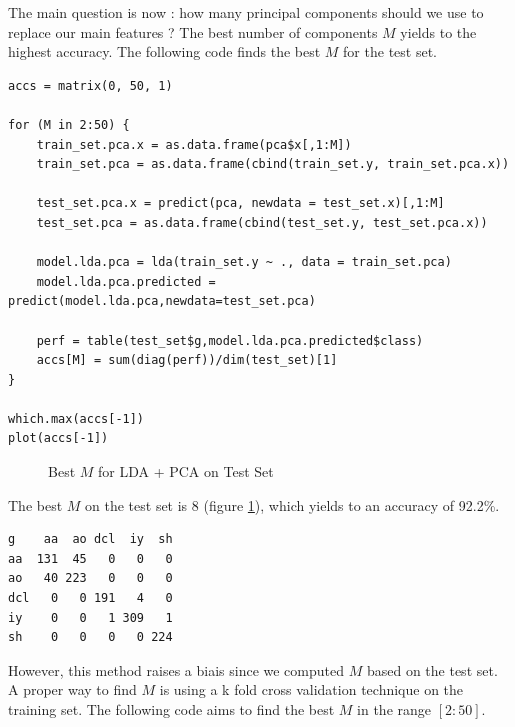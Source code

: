 \documentclass[]{report}
\newcommand{\inputtikz}[2]{%
	\scalebox{#1}{}  
}
\begin{document}
The main question is now : how many principal components should we use to replace our main features ? The best number of components $M$ yields to the highest accuracy. The following code finds the best $M$ for the test set.

\begin{lstlisting}
accs = matrix(0, 50, 1)

for (M in 2:50) {
	train_set.pca.x = as.data.frame(pca$x[,1:M])
	train_set.pca = as.data.frame(cbind(train_set.y, train_set.pca.x))
	
	test_set.pca.x = predict(pca, newdata = test_set.x)[,1:M]
	test_set.pca = as.data.frame(cbind(test_set.y, test_set.pca.x))
	
	model.lda.pca = lda(train_set.y ~ ., data = train_set.pca)
	model.lda.pca.predicted = predict(model.lda.pca,newdata=test_set.pca)
	
	perf = table(test_set$g,model.lda.pca.predicted$class)
	accs[M] = sum(diag(perf))/dim(test_set)[1]
}

which.max(accs[-1])
plot(accs[-1])
\end{lstlisting}

\begin{figure}[!hb]
	\centering
	\inputtikz{0.5}{Figures/lda_pca.tex}
	\caption{Best $M$ for LDA + PCA on Test Set}
	\label{fig:lda_pca}
\end{figure}

The best $M$ on the test set is 8 (figure \ref{fig:lda_pca}), which yields to an accuracy of 92.2\%.

\begin{verbatim}
g    aa  ao dcl  iy  sh
aa  131  45   0   0   0
ao   40 223   0   0   0
dcl   0   0 191   4   0
iy    0   0   1 309   1
sh    0   0   0   0 224
\end{verbatim}

 However, this method raises a biais since we computed $M$ based on the test set. A proper way to find $M$ is using a k fold cross validation technique on the training set. The following code aims to find the best $M$ in the range $[2:50]$.
\end{document}
